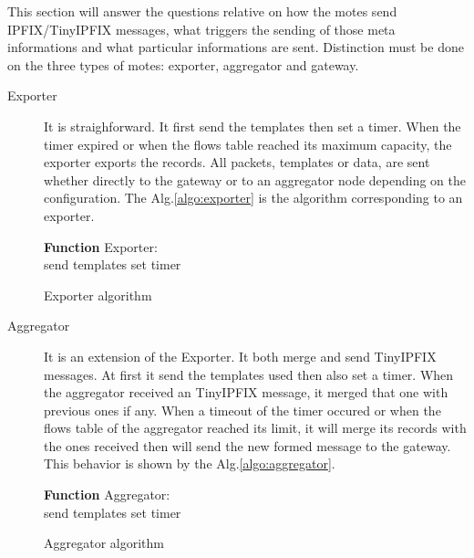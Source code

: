 This section will answer the questions relative on how the motes send IPFIX/TinyIPFIX messages, what triggers the sending of those meta informations and what particular informations are sent. Distinction must be done on the three types of motes: exporter, aggregator and gateway.\\

\begin{description}
  \item[Exporter] It is straighforward. It first send the templates then set a timer. When the timer expired or when the flows table reached its maximum capacity, the exporter exports the records. All packets, templates or data, are sent whether directly to the gateway or to an aggregator node depending on the configuration. The Alg.\ref{algo:exporter} is the algorithm corresponding to an exporter.

  \begin{algorithm}
    \textbf{Function} Exporter:\\
    send templates\;
    set timer\;
   \caption{Exporter algorithm}
   \label{algo:exporter}
  \end{algorithm}

  \item[Aggregator] It is an extension of the Exporter. It both merge and send TinyIPFIX messages. At first it send the templates used then also set a timer. When the aggregator received an TinyIPFIX message, it merged that one with previous ones if any. When a timeout of the timer occured or when the flows table of the aggregator reached its limit, it will merge its records with the ones received then will send the new formed message to the gateway. This behavior is shown by the Alg.\ref{algo:aggregator}.

  \begin{algorithm}
    \textbf{Function} Aggregator:\\
    send templates\;
    set timer\;
   \caption{Aggregator algorithm}
   \label{algo:aggregator}
  \end{algorithm}


\end{description}
